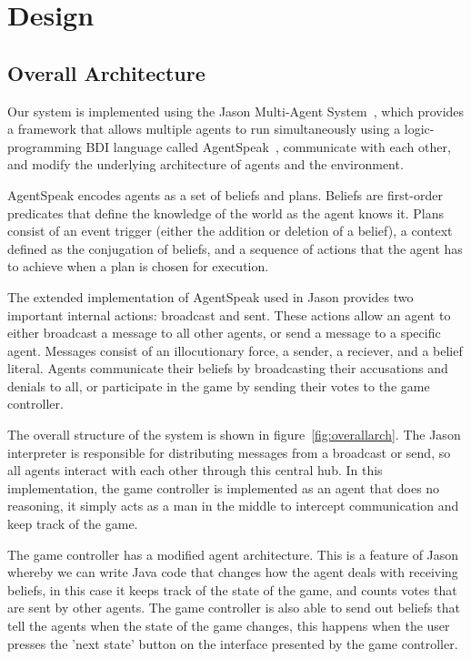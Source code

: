 \documentclass[12pt]{article} %
\begin{document}
\section{Design}

\subsection{Overall Architecture}

Our system is implemented using the Jason Multi-Agent System~\cite{JAS2015}, which provides a framework that allows multiple agents to run simultaneously using a logic-programming BDI language called AgentSpeak~\cite{RAO1996}, communicate with each other, and modify the underlying architecture of agents and the environment.

AgentSpeak encodes agents as a set of beliefs and plans. Beliefs are first-order predicates that define the knowledge of the world as the agent knows it. Plans consist of an event trigger (either the addition or deletion of a belief), a context defined as the conjugation of beliefs, and a sequence of actions that the agent has to achieve when a plan is chosen for execution.

The extended implementation of AgentSpeak used in Jason provides two important internal actions: broadcast and sent. These actions allow an agent to either broadcast a message to all other agents, or send a message to a specific agent. Messages consist of an illocutionary force, a sender, a reciever, and a belief literal. Agents communicate their beliefs by broadcasting their accusations and denials to all, or participate in the game by sending their votes to the game controller.

The overall structure of the system is shown in figure~\ref{fig:overallarch}. The Jason interpreter is responsible for distributing messages from a broadcast or send, so all agents interact with each other through this central hub. In this implementation, the game controller is implemented as an agent that does no reasoning, it simply acts as a man in the middle to intercept communication and keep track of the game.

The game controller has a modified agent architecture. This is a feature of Jason whereby we can write Java code that changes how the agent deals with receiving beliefs, in this case it keeps track of the state of the game, and counts votes that are sent by other agents. The game controller is also able to send out beliefs that tell the agents when the state of the game changes, this happens when the user presses the 'next state' button on the interface presented by the game controller.
\end{document}
